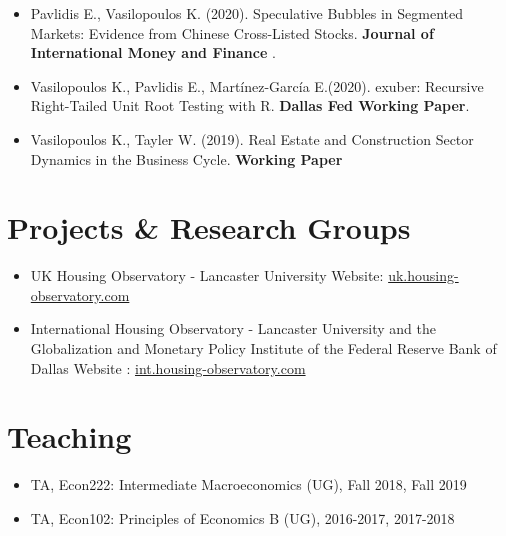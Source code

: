 \documentclass[10pt,]{article}
\begin{document}
              \begin{itemize}
              \item
                Pavlidis E., Vasilopoulos K. (2020). Speculative Bubbles
                in Segmented Markets: Evidence from Chinese Cross-Listed
                Stocks. \textbf{Journal of International Money and
                Finance} .
              \item
                Vasilopoulos K., Pavlidis E., Martínez-García E.(2020).
                exuber: Recursive Right-Tailed Unit Root Testing with R.
                \textbf{Dallas Fed Working Paper}.
              \item
                Vasilopoulos K., Tayler W. (2019). Real Estate and
                Construction Sector Dynamics in the Business Cycle.
                \textbf{Working Paper}
              \end{itemize}

              \hypertarget{projects-research-groups}{%
              \section{Projects \& Research
              Groups}\label{projects-research-groups}}

              \begin{itemize}
              \item
                UK Housing Observatory - Lancaster University \newline 
                Website: \url{uk.housing-observatory.com}
              \item
                International Housing Observatory - Lancaster University
                and the Globalization and Monetary Policy Institute of
                the Federal Reserve Bank of Dallas \newline  Website :
                \url{int.housing-observatory.com}
              \end{itemize}

              \hypertarget{teaching}{%
              \section{Teaching}\label{teaching}}

              \begin{itemize}
              \item
                TA, Econ222: Intermediate Macroeconomics (UG), Fall
                2018, Fall 2019
              \item
                TA, Econ102: Principles of Economics B (UG), 2016-2017,
                2017-2018
              \end{itemize}
\end{document}
